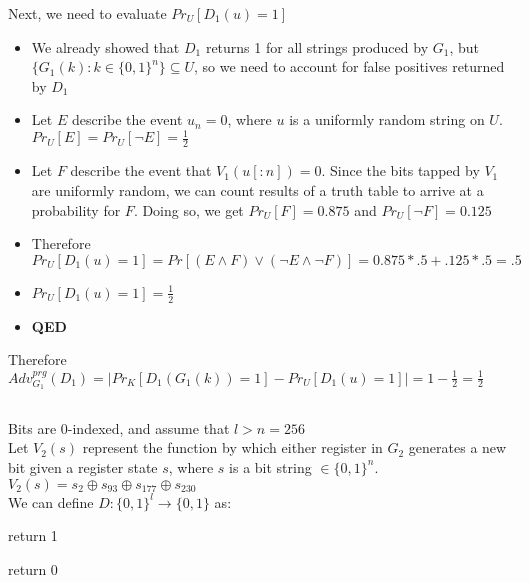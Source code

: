 \documentclass[]{article}
\begin{document}
Next, we need to evaluate $Pr_U[D_1(u) = 1]$
\begin{itemize}
	\item We already showed that $D_1$ returns 1 for all strings produced by $G_1$, but $\{G_1(k): k \in \{0,1\}^n\} \subseteq U$, so we need to account for false positives returned by $D_1$
	\item Let $E$ describe the event $u_{n} = 0$, where $u$ is a uniformly random string on $U$. $Pr_U[E] = Pr_U[\lnot E] = \frac{1}{2}$
	\item Let $F$ describe the event that $V_1(u[:n]) = 0$. Since the bits tapped by $V_1$ are uniformly random, we can count results of a truth table to arrive at a probability for $F$. Doing so, we get $Pr_U[F] = 0.875$ and $Pr_U[\lnot F] = 0.125$
	\item Therefore $Pr_U[D_1(u) = 1] = Pr[(E \land F) \lor (\lnot E \land \lnot F)] = 0.875 * .5 + .125 * .5 = .5$
	\item $Pr_U[D_1(u) = 1] = \frac{1}{2}$
	\item \textbf{QED}
\end{itemize}
Therefore $Adv^{prg}_{G_1}(D_1) = |Pr_K[D_1(G_1(k)) = 1] - Pr_U[D_1(u)=1]| = 1 - \frac{1}{2} = \frac{1}{2}$
\subsection{}
Bits are 0-indexed, and assume that $l > n = 256$
\\
Let $V_2(s)$ represent the function by which either register in $G_2$ generates a new bit given a register state $s$, where $s$ is a bit string $\in \{0,1\}^n$. $V_2(s) = s_{2} \oplus s_{93} \oplus s_{177} \oplus s_{230}$
\\
We can define $D:\{0,1\}^l \rightarrow \{0,1\}$ as:
\\
\begin{algorithm}[H]
	 {
		return 1
	}
	
	return 0
	\caption{$D_2(s)$}
\end{algorithm}
\end{document}
